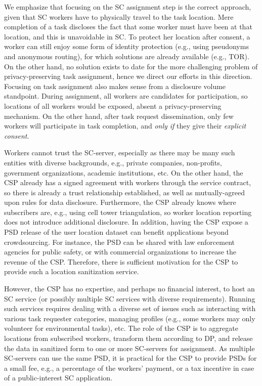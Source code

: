\documentclass{USC-Thesis}
\numberwithin{equation}{chapter}
\begin{document}
We emphasize that focusing on the SC assignment step is the correct approach, given that SC workers have to physically travel to the task location. Mere completion of a task discloses the fact that some worker must have been at that location, and this is unavoidable in SC. To protect her location after consent, a worker can still enjoy some form of identity protection (e.g., using pseudonyms and anonymous routing), for which solutions are already available (e.g., TOR). On the other hand, no solution exists to date for the more challenging problem of privacy-preserving task assignment, hence we direct our efforts in this direction.
Focusing on task assignment also makes sense from a disclosure volume standpoint. During assignment, all workers are candidates for participation, so locations of all workers would be exposed, absent a privacy-preserving mechanism. On the other hand, after task request dissemination, only few workers will participate in task completion, and {\em only if} they give their {\em explicit consent}.

Workers cannot trust the SC-server, especially as there may be many such entities with diverse backgrounds, e.g., private companies, non-profits, government organizations, academic institutions, etc. On the other hand, the CSP already has a signed agreement with workers through the service contract, so there is already a trust relationship established, as well as mutually-agreed upon rules for data disclosure. Furthermore, the CSP already knows where subscribers are, e.g., using cell tower triangulation, so worker location reporting does not introduce additional disclosure. In addition, having the CSP expose a PSD release of the user location dataset can benefit applications beyond crowdsourcing. For instance, the PSD can be shared with law enforcement agencies for public safety, or with commercial organizations to increase the revenue of the CSP. Therefore, there is sufficient motivation for the CSP to provide such a location sanitization service.

However, the CSP has no expertise, and perhaps no financial interest, to host an SC service (or possibly multiple SC services with diverse requirements). Running such services requires dealing with a diverse set of issues such as interacting with various task requester categories, managing profiles (e.g., some workers may only volunteer for environmental tasks), etc. The role of the CSP is to aggregate locations from subscribed workers, transform them according to DP, and release the data in sanitized form to one or more SC-servers for assignment. As multiple SC-servers can use the same PSD, it is practical for the CSP to provide PSDs for a small fee, e.g., a percentage of the workers' payment, or a tax incentive in case of a public-interest SC application.
\end{document}
